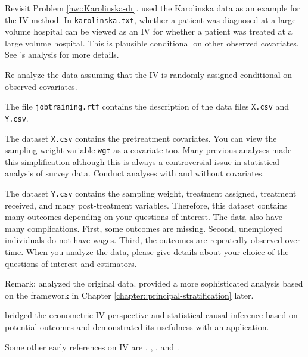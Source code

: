 \begin{HomeworkProblem}\label{exr:21-9}

Revisit Problem \ref{hw::Karolinska-dr}.
\citet{rubin2008objective} used the Karolinska data as an example for the IV method. In \texttt{karolinska.txt}, whether a patient was diagnosed at a large volume hospital can be viewed as an IV for whether a patient was treated at a large volume hospital. This is plausible conditional on other observed covariates. See \citet{rubin2008objective}'s analysis for more details.


Re-analyze the data assuming that the IV is randomly assigned conditional on observed covariates.



\end{HomeworkProblem}

\begin{HomeworkProblem}\label{exr:21-10}

The file \texttt{jobtraining.rtf} contains the description of the data files \texttt{X.csv} and \texttt{Y.csv}.

The dataset \texttt{X.csv} contains the pretreatment covariates. You can view the sampling weight variable \texttt{wgt} as a covariate too. Many previous analyses made this simplification although this is always a controversial issue in statistical analysis of survey data.
Conduct analyses with and without covariates.

The dataset \texttt{Y.csv} contains the sampling weight, treatment assigned, treatment received, and many post-treatment variables. Therefore, this dataset contains many outcomes depending on your questions of interest. The data also have many complications. First, some outcomes are missing. Second, unemployed individuals do not have wages. Third, the outcomes are repeatedly observed over time. When you analyze the data, please give details about your choice of the questions of interest and estimators.

Remark:
\citet{schochet2008does} analyzed the original data.
\citet{frumento2012evaluating} provided a more sophisticated analysis based on the framework in Chapter \ref{chapter::principal-stratification} later.


\end{HomeworkProblem}

\begin{HomeworkProblem}\label{exr:21-11}

\citet{angrist1996identification} bridged the econometric IV perspective and statistical causal inference based on potential outcomes and demonstrated its usefulness with an application.

Some other early references on IV are \citet{permutt1989simultaneous},  \citet{sommer1991estimating}, \citet{baker1994paired}, and \citet{cuzick1997adjusting}.



\end{HomeworkProblem}
